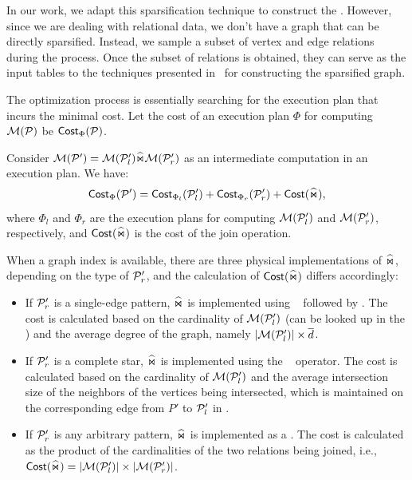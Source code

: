 In our work, we adapt this sparsification technique to construct the \glogue. However, since we are dealing with relational data, we don't have a graph that can be directly sparsified. Instead, we sample a subset of vertex and edge relations during the \rgmapping process. Once the subset of relations is obtained, they can serve as the input tables to the techniques presented in~\cite{gart} for constructing the sparsified graph.

 The optimization process is essentially searching for the execution plan that incurs the minimal cost. Let the cost of an execution plan $\Phi$ for computing $\mathcal{M}(\mathcal{P})$ be ${\mathsf{Cost}}_\Phi(\mathcal{P})$. %

Consider $\mathcal{M}(\mathcal{P}') = \mathcal{M}(\mathcal{P}'_l) \widehat{\Join} \mathcal{M}(\mathcal{P}'_r)$ as an intermediate computation in an execution plan. We have:
\[
{\mathsf{Cost}}_{\Phi}(\mathcal{P}') = {\mathsf{Cost}}_{\Phi_l}(\mathcal{P}'_l) + {\mathsf{Cost}}_{\Phi_r}(\mathcal{P}'_r) + {\mathsf{Cost}}(\widehat{\Join}),
\]
where $\Phi_l$ and $\Phi_r$ are the execution plans for computing $\mathcal{M}(\mathcal{P}'_l)$ and $\mathcal{M}(\mathcal{P}'_r)$, respectively, and ${\mathsf{Cost}}(\widehat{\Join})$ is the cost of the join operation.

When a graph index is available, there are three physical implementations of $\widehat{\Join}$, depending on the type of $\mathcal{P}'_r$, and the calculation of ${\mathsf{Cost}}(\widehat{\Join})$ differs accordingly:
\begin{itemize}
\item If $\mathcal{P}'_r$ is a single-edge pattern, $\widehat{\Join}$ is implemented using \expandedge~ followed by \getvertex. The cost is calculated based on the cardinality of $\mathcal{M}(\mathcal{P}'_l)$ (can be looked up in the \glogue) and the average degree of the graph, namely $|\mathcal{M}(\mathcal{P}'_l)| \times \overline{d}$.
\item If $\mathcal{P}'_r$ is a complete star, $\widehat{\Join}$ is implemented using the \expandintersect~ operator. The cost is calculated based on the cardinality of $\mathcal{M}(\mathcal{P}'_l)$ and the average intersection size of the neighbors of the vertices being intersected, which is maintained on the corresponding edge from $P'$ to $\mathcal{P}'_l$ in \glogue.
\item  If $\mathcal{P}'_r$ is any arbitrary pattern, $\widehat{\Join}$ is implemented as a \hashjoin. The cost is calculated as the product of the cardinalities of the two relations being joined, i.e., ${\mathsf{Cost}}(\widehat{\Join}) = |\mathcal{M}(\mathcal{P}'_l)| \times |\mathcal{M}(\mathcal{P}'_r)|$.
\end{itemize}

